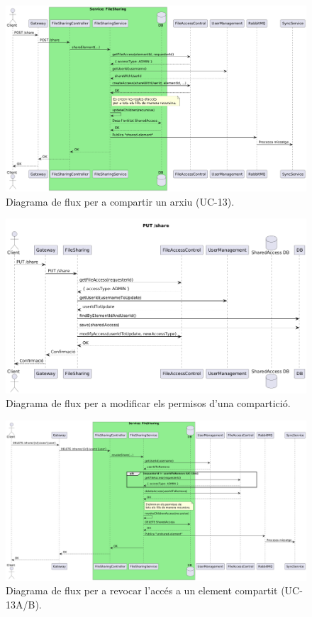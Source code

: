 \begin{figure}[H]
    \centering
    \includegraphics[width=1\textwidth]{Figures/flux/share_files.png}
    \caption{Diagrama de flux per a compartir un arxiu (UC-13).}
    \label{fig:flow_share_files}
\end{figure}

\begin{figure}[H]
    \centering
    \includegraphics[width=1\textwidth]{Figures/flux/modify_share_access.png}
    \caption{Diagrama de flux per a modificar els permisos d'una compartició.}
    \label{fig:flow_modify_share_access}
\end{figure}

\begin{figure}[H]
    \centering
    \includegraphics[width=1\textwidth]{Figures/flux/revoke_share.png}
    \caption{Diagrama de flux per a revocar l'accés a un element compartit (UC-13A/B).}
    \label{fig:flow_revoke_share}
\end{figure}

